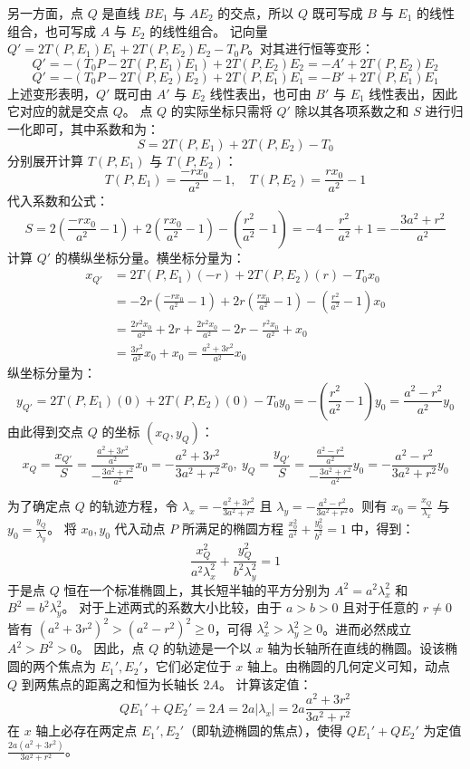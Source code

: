 \begin{solution}
另一方面，点 $Q$ 是直线 $BE_1$ 与 $AE_2$ 的交点，所以 $Q$ 既可写成 $B$ 与 $E_1$ 的线性组合，也可写成 $A$ 与 $E_2$ 的线性组合。
记向量 $Q' = 2T(P,E_1) E_1 + 2T(P,E_2) E_2 - T_0 P$。对其进行恒等变形：
$$Q' = - (T_0 P - 2T(P,E_1) E_1) + 2T(P,E_2) E_2 = -A' + 2T(P,E_2) E_2$$
$$Q' = - (T_0 P - 2T(P,E_2) E_2) + 2T(P,E_1) E_1 = -B' + 2T(P,E_1) E_1$$
上述变形表明，$Q'$ 既可由 $A'$ 与 $E_2$ 线性表出，也可由 $B'$ 与 $E_1$ 线性表出，因此它对应的就是交点 $Q$。
点 $Q$ 的实际坐标只需将 $Q'$ 除以其各项系数之和 $S$ 进行归一化即可，其中系数和为：
$$S = 2T(P,E_1) + 2T(P,E_2) - T_0$$
分别展开计算 $T(P,E_1)$ 与 $T(P,E_2)$：
$$T(P,E_1) = \frac{-r x_0}{a^2} - 1, \quad T(P,E_2) = \frac{r x_0}{a^2} - 1$$
代入系数和公式：
$$S = 2\left(\frac{-r x_0}{a^2} - 1\right) + 2\left(\frac{r x_0}{a^2} - 1\right) - \left(\frac{r^2}{a^2} - 1\right) = -4 - \frac{r^2}{a^2} + 1 = -\frac{3a^2 + r^2}{a^2}$$
计算 $Q'$ 的横纵坐标分量。横坐标分量为：
\begin{align*}
x_{Q'} &= 2T(P,E_1)(-r) + 2T(P,E_2)(r) - T_0 x_0 \\
&= -2r\left(\frac{-r x_0}{a^2} - 1\right) + 2r\left(\frac{r x_0}{a^2} - 1\right) - \left(\frac{r^2}{a^2} - 1\right) x_0 \\
&= \frac{2r^2 x_0}{a^2} + 2r + \frac{2r^2 x_0}{a^2} - 2r - \frac{r^2 x_0}{a^2} + x_0 \\
&= \frac{3r^2}{a^2} x_0 + x_0 = \frac{a^2 + 3r^2}{a^2} x_0
\end{align*}
纵坐标分量为：
$$y_{Q'} = 2T(P,E_1)(0) + 2T(P,E_2)(0) - T_0 y_0 = -\left(\frac{r^2}{a^2} - 1\right) y_0 = \frac{a^2 - r^2}{a^2} y_0$$
由此得到交点 $Q$ 的坐标 $(x_Q, y_Q)$：
$$x_Q = \frac{x_{Q'}}{S} = \frac{\frac{a^2 + 3r^2}{a^2}}{-\frac{3a^2 + r^2}{a^2}} x_0 = - \frac{a^2 + 3r^2}{3a^2 + r^2} x_0,~y_Q = \frac{y_{Q'}}{S} = \frac{\frac{a^2 - r^2}{a^2}}{-\frac{3a^2 + r^2}{a^2}} y_0 = - \frac{a^2 - r^2}{3a^2 + r^2} y_0$$

为了确定点 $Q$ 的轨迹方程，令 $\lambda_x = - \frac{a^2 + 3r^2}{3a^2 + r^2}$ 且 $\lambda_y = - \frac{a^2 - r^2}{3a^2 + r^2}$。则有 $x_0 = \frac{x_Q}{\lambda_x}$ 与 $y_0 = \frac{y_Q}{\lambda_y}$。
将 $x_0, y_0$ 代入动点 $P$ 所满足的椭圆方程 $\frac{x_0^2}{a^2} + \frac{y_0^2}{b^2} = 1$ 中，得到：
$$\frac{x_Q^2}{a^2 \lambda_x^2} + \frac{y_Q^2}{b^2 \lambda_y^2} = 1$$
于是点 $Q$ 恒在一个标准椭圆上，其长短半轴的平方分别为 $A^2 = a^2 \lambda_x^2$ 和 $B^2 = b^2 \lambda_y^2$。
对于上述两式的系数大小比较，由于 $a > b > 0$ 且对于任意的 $r \neq 0$ 皆有 $(a^2 + 3r^2)^2 > (a^2 - r^2)^2 \ge 0$，可得 $\lambda_x^2 > \lambda_y^2 \ge 0$。进而必然成立 $A^2 > B^2 > 0$。
因此，点 $Q$ 的轨迹是一个以 $x$ 轴为长轴所在直线的椭圆。设该椭圆的两个焦点为 $E_1', E_2'$，它们必定位于 $x$ 轴上。由椭圆的几何定义可知，动点 $Q$ 到两焦点的距离之和恒为长轴长 $2A$。
计算该定值：
$$QE_1' + QE_2' = 2A = 2a |\lambda_x| = 2a \frac{a^2 + 3r^2}{3a^2 + r^2}$$
在 $x$ 轴上必存在两定点 $E_1', E_2'$（即轨迹椭圆的焦点），使得 $QE_1' + QE_2'$ 为定值 $\frac{2a(a^2 + 3r^2)}{3a^2 + r^2}$。
\end{solution}

